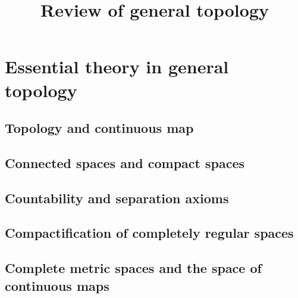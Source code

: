 





\title{Review of general topology}


\author{}

\maketitle

\setcounter{tocdepth}{1}
\tableofcontents

\part{Essential theory in general topology}
\chapter{Topology and continuous map}\label{topology}
    
    
    
    
\chapter{Connected spaces and compact spaces}\label{connectedness and compactness}
    
    
    
    
    
    
\chapter{Countability and separation axioms}\label{countability and separation axioms}
    
    
    
     
\chapter{Compactification of completely regular spaces}\label{compactification}
    
    
\chapter{Complete metric spaces and the space of continuous maps}\label{completeness and C0 spaces}
    
    
    
    

